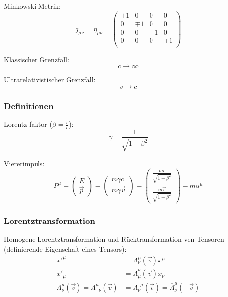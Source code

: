 		\noindent
		Minkowski-Metrik:
		\begin{equation}
			g_{\mu\nu} = \eta_{\mu\nu}
			= \left( \begin{matrix}
				\pm1 & 0		& 0		& 0		\\
				0		& \mp1 & 0		& 0		\\
				0		& 0		& \mp1 & 0		\\
				0		& 0		& 0		& \mp1 \\
			\end{matrix} \right)
		\end{equation}

		\noindent
		Klassischer Grenzfall:
		\begin{equation}
			c \rightarrow \infty
		\end{equation}

		\noindent
		Ultrarelativistischer Grenzfall:
		\begin{equation}
			v\rightarrow c
		\end{equation}

		\subsubsection{Definitionen}
			\noindent
			Lorentz-faktor ($\beta = \frac{v}{c}$):
			\begin{equation}
				\gamma = \frac{1}{\sqrt{1-\beta^2}}
			\end{equation}

			\noindent
			Viererimpuls:
			\begin{equation}
				P^\mu =
				\left(\begin{matrix}
					E \\ \vec{p}
				\end{matrix}\right)
				= \left(\begin{matrix}
					m\gamma c \\ m\gamma\vec{v}
				\end{matrix}\right)
				= \left(\begin{matrix}
					\frac{mc}{\sqrt{1-\beta^2}} \\ \frac{m\vec{v}}{\sqrt{1-\beta^2}}
				\end{matrix}\right)
				= m u^\mu
			\end{equation}

		\subsubsection{Lorentztransformation}
			\noindent
			Homogene Lorentztransformation und Rücktransformation von Tensoren (definierende Eigenschaft eines Tensors):
			\begin{equation}
				\begin{aligned}
					x'^\mu &=					\Lambda^{\mu}_{\nu}(\vec{v}) x^\mu \\
					x'_\mu &= \overline{\Lambda}_\mu^{\nu}(\vec{v}) x_\nu \\
					\Lambda^{\mu}_{\nu}(\vec{v}) = \Lambda^{\mu}_{\phantom{\mu}\nu}(\vec{v}) &= \Lambda^{\phantom{\nu}\mu}_{\nu}(\vec{v}) = \overline{\Lambda}^{\mu}_{\nu}(-\vec{v})
				\end{aligned}
			\end{equation}

